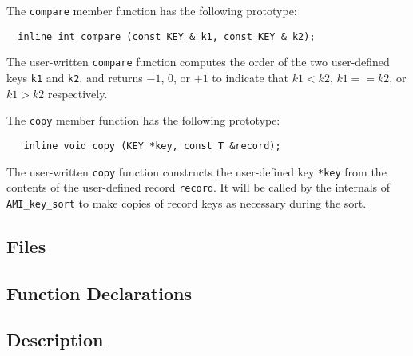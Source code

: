 The \lstinline|compare| member function has the following
prototype:
\begin{lstlisting}
  inline int compare (const KEY & k1, const KEY & k2);
\end{lstlisting}

The user-written \lstinline|compare| function computes the order of
the two user-defined keys \lstinline|k1| and \lstinline|k2|, and
returns $-1$, $0$, or $+1$ to indicate that $k1<k2$, $k1==k2$, or
$k1>k2$ respectively.

The \lstinline|copy| member function has the following prototype:
\begin{lstlisting}
   inline void copy (KEY *key, const T &record);
\end{lstlisting}

The user-written \lstinline|copy| function constructs the user-defined
key \lstinline|*key| from the contents of the user-defined record
\lstinline|record|. It will be called by the internals of
\lstinline|AMI_key_sort| to make copies of record keys as necessary
during the sort.



 


\subsection{Files}
  \btabb
         {}
  \etabb

\subsection{Function Declarations}

  \btabb
      {}

      {}
  \etabb

\subsection{Description}

